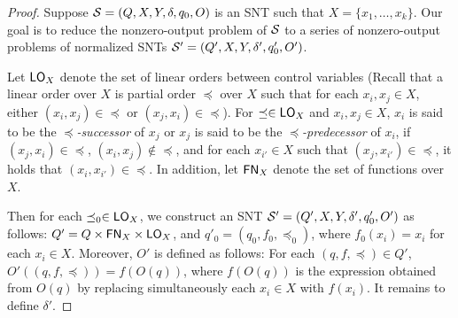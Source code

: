 \begin{appendix}
{\begin{proof}
Suppose ${\mathcal{S} } = (Q, X, Y, \delta, q_0, O)$ is an SNT such that $X=\{x_1,\dots, x_k\}$. Our goal is to reduce the nonzero-output problem of ${\mathcal{S} }$ to a series of  nonzero-output problems of normalized SNTs ${\mathcal{S} }'  = (Q', X, Y, \delta', q'_0, O')$.



Let $\mathsf{LO}_{X}$ denote the set of linear orders between control variables (Recall that a linear order over $X$ is partial order $\preceq$  over $X$ such that for each $x_i, x_j \in X$, either $(x_i, x_j) \in \preceq$ or $(x_j, x_i) \in \preceq$). For $\preceq \in \mathsf{LO}_X$ and $x_i, x_j \in X$,  $x_i$ is said to be the \emph{$\preceq$-successor} of  $x_j$ or $x_j$ is said to be the \emph{$\preceq$-predecessor} of $x_i$, if $(x_j, x_i) \in \preceq$, $(x_i, x_j) \not \in \preceq$, and for each $x_{i'} \in X$ such that $(x_j, x_{i'}) \in \preceq$, it holds that $(x_i, x_{i'}) \in \preceq$. In addition, let $\mathsf{FN}_X$ denote the set of functions over $X$.

Then for each $\preceq_0 \in \mathsf{LO}_X$, we construct an SNT ${\mathcal{S} }'= (Q', X, Y, \delta', q'_0, O')$ as follows: $Q'= Q \times \mathsf{FN}_X \times \mathsf{LO}_X$, and $q'_0=(q_0, f_0, \preceq_0)$, where $f_0(x_i)=x_i$ for each $x_i \in X$. Moreover, $O'$ is defined as follows: For each $(q, f, \preceq) \in Q'$, $O'((q, f, \preceq)) = f(O(q))$, where $f(O(q))$ is the expression obtained from $O(q)$ by replacing simultaneously each $x_i \in X$ with $f(x_i)$. It remains to define $\delta'$.


\end{proof}}
\end{appendix}
